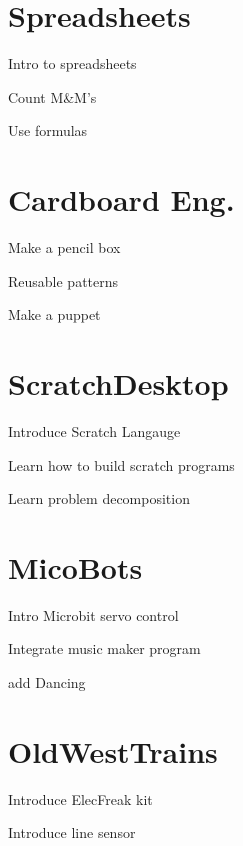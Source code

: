 \documentclass{article}
\def\FourthGradeFour{Spreadsheets}
\def\FourthGradeFive{Cardboard Eng.}
\def\FourthGradeSix{ScratchDesktop}
\def\FourthGradeSeven{MicoBots}
\def\FourthGradeEight{OldWestTrains}
\begin{document}
	\section{\FourthGradeFour}
	\begin{todolist}
		\item Intro to spreadsheets
		\item Count M\&M's
		\item Use formulas
	\end{todolist}

\section{\FourthGradeFive}
\begin{todolist}
	\item Make a pencil box
	\item Reusable patterns
	\item Make a puppet
\end{todolist}
\section{\FourthGradeSix}
\begin{todolist}
	\item Introduce Scratch Langauge
	\item Learn how to build scratch programs
	\item Learn problem decomposition
\end{todolist}
\section{\FourthGradeSeven}
\begin{todolist}
	\item Intro Microbit servo control
	\item Integrate music maker program
	\item add Dancing
\end{todolist}
\section{\FourthGradeEight}
\begin{todolist}
	\item Introduce ElecFreak kit
	\item Introduce line sensor
\end{todolist}
\newpage
\end{document}
